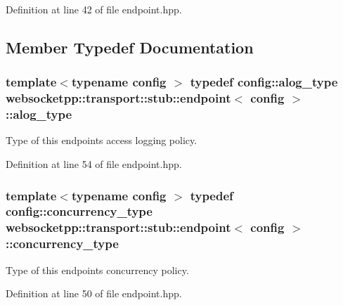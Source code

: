 Definition at line 42 of file endpoint.\+hpp.



\subsection{Member Typedef Documentation}
\hypertarget{classwebsocketpp_1_1transport_1_1stub_1_1endpoint_aa62a4dd626d9b8757972c0ef66e72419}{}
\subsubsection[{alog\+\_\+type}]{\setlength{\rightskip}{0pt plus 5cm}template$<$typename config $>$ typedef config\+::alog\+\_\+type {\bf websocketpp\+::transport\+::stub\+::endpoint}$<$ config $>$\+::{\bf alog\+\_\+type}}\label{classwebsocketpp_1_1transport_1_1stub_1_1endpoint_aa62a4dd626d9b8757972c0ef66e72419}


Type of this endpoint\textquotesingle{}s access logging policy. 



Definition at line 54 of file endpoint.\+hpp.

\hypertarget{classwebsocketpp_1_1transport_1_1stub_1_1endpoint_a1d70a45c1abdc4c84867a94511da067e}{}
\subsubsection[{concurrency\+\_\+type}]{\setlength{\rightskip}{0pt plus 5cm}template$<$typename config $>$ typedef config\+::concurrency\+\_\+type {\bf websocketpp\+::transport\+::stub\+::endpoint}$<$ config $>$\+::{\bf concurrency\+\_\+type}}\label{classwebsocketpp_1_1transport_1_1stub_1_1endpoint_a1d70a45c1abdc4c84867a94511da067e}


Type of this endpoint\textquotesingle{}s concurrency policy. 



Definition at line 50 of file endpoint.\+hpp.

